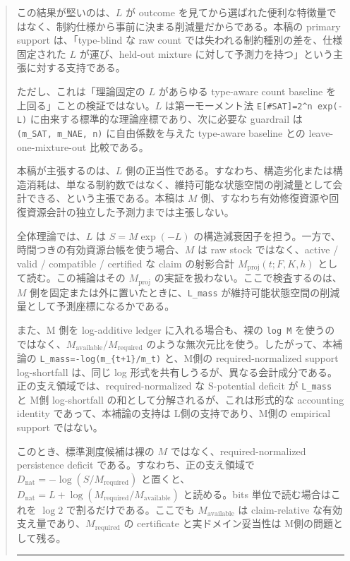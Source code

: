 \documentclass[12pt,a4paper]{article}
\begin{document}
\begin{abstract}
この結果が堅いのは、$L$ が outcome を見てから選ばれた便利な特徴量ではなく、制約仕様から事前に決まる削減量だからである。本稿の primary support は、「type-blind な raw count では失われる制約種別の差を、仕様固定された $L$ が運び、held-out mixture に対して予測力を持つ」という主張に対する支持である。

ただし、これは「理論固定の $L$ があらゆる type-aware count baseline を上回る」ことの検証ではない。$L$ は第一モーメント法 \texttt{E{[}\#SAT{]}=2\^{}n\ exp(-L)} に由来する標準的な理論座標であり、次に必要な guardrail は \texttt{(m\_SAT,\ m\_NAE,\ n)} に自由係数を与えた type-aware baseline との leave-one-mixture-out 比較である。

本稿が主張するのは、$L$ 側の正当性である。すなわち、構造劣化または構造消耗は、単なる制約数ではなく、維持可能な状態空間の削減量として会計できる、という主張である。本稿は $M$ 側、すなわち有効修復資源や回復資源会計の独立した予測力までは主張しない。

全体理論では、$L$ は \(S=M\exp(-L)\) の構造減衰因子を担う。一方で、時間つきの有効資源台帳を使う場合、\(M\) は raw stock ではなく、active / valid / compatible / certified な claim の射影合計 \(M_{\mathrm{proj}}(t;F,K,h)\) として読む。この補論はその \(M_{\mathrm{proj}}\) の実証を扱わない。ここで検査するのは、\(M\) 側を固定または外に置いたときに、\texttt{L\_mass} が維持可能状態空間の削減量として予測座標になるかである。

また、M 側を log-additive ledger に入れる場合も、裸の \texttt{log\ M} を使うのではなく、\(M_{\mathrm{available}}/M_{\mathrm{required}}\) のような無次元比を使う。したがって、本補論の \texttt{L\_mass=-log(m\_\{t+1\}/m\_t)} と、M側の required-normalized support log-shortfall は、同じ log 形式を共有しうるが、異なる会計成分である。正の支え領域では、required-normalized な S-potential deficit が \texttt{L\_mass} と M側 log-shortfall の和として分解されるが、これは形式的な accounting identity であって、本補論の支持は L側の支持であり、M側の empirical support ではない。

このとき、標準測度候補は裸の \(M\) ではなく、required-normalized persistence deficit である。すなわち、正の支え領域で \(D_{\mathrm{nat}}=-\log(S/M_{\mathrm{required}})\) と置くと、\(D_{\mathrm{nat}}=L+\log(M_{\mathrm{required}}/M_{\mathrm{available}})\) と読める。bits 単位で読む場合はこれを \(\log 2\) で割るだけである。ここでも \(M_{\mathrm{available}}\) は claim-relative な有効支え量であり、\(M_{\mathrm{required}}\) の certificate と実ドメイン妥当性は M側の問題として残る。

\begin{center}\rule{0.5\linewidth}{0.5pt}\end{center}
\end{abstract}
\end{document}
